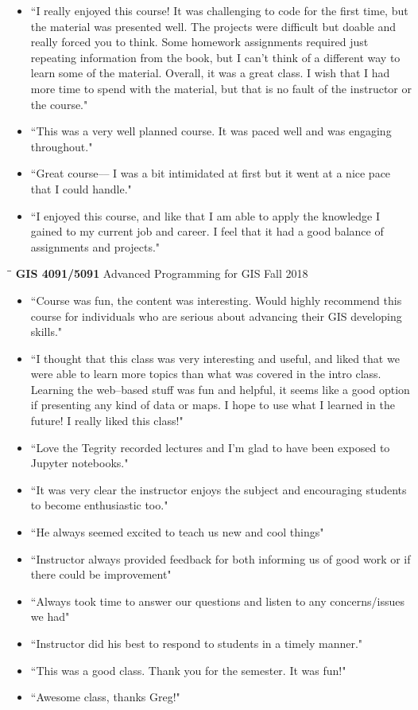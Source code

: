 \documentclass{res}
\begin{document}
\begin{resume}
\begin{itemize}
\item``I really enjoyed this course! It was challenging to code for the first time, but the material was presented well. The projects were difficult but doable and really forced you to think. Some homework assignments required just repeating information from the book, but I can't think of a different way to learn some of the material. Overall, it was a great class. I wish that I had more time to spend with the material, but that is no fault of the instructor or the course."
\item``This was a very well planned course. It was paced well and was engaging throughout."
\item``Great course–– I was a bit intimidated at first but it went at a nice pace that I could handle."
\item``I enjoyed this course, and like that I am able to apply the knowledge I gained to my current job and career. I feel that it had a good balance of assignments and projects."
\end{itemize}
\begin{tabbing}
	\hspace{2.3in}\= \hspace{2.6in}\= \kill %
	{\bf GIS 4091/5091} \>Advanced Programming for GIS     \>Fall 2018\\
	\>
\end{tabbing}\vspace{-20pt}      %
\begin{itemize}  
\item ``Course was fun, the content was interesting. Would highly recommend this course for individuals who are serious about advancing their GIS developing skills."
\item ``I thought that this class was very interesting and useful, and liked that we were able to learn more topics than what was covered in the intro class. Learning the web–based stuff was fun and helpful, it seems like a good option if presenting any kind of data or maps. I hope to use what I learned in the future! I really liked this class!"
\item ``Love the Tegrity recorded lectures and I'm glad to have been exposed to Jupyter notebooks."
\item ``It was very clear the instructor enjoys the subject and encouraging students to become enthusiastic too."
\item ``He always seemed excited to teach us new and cool things"
\item ``Instructor always provided feedback for both informing us of good work or if there could be improvement"
\item ``Always took time to answer our questions and listen to any concerns/issues we had"
\item ``Instructor did his best to respond to students in a timely manner."
\item ``This was a good class. Thank you for the semester. It was fun!"
\item ``Awesome class, thanks Greg!"
\end{itemize}
\end{resume}
\end{document}
